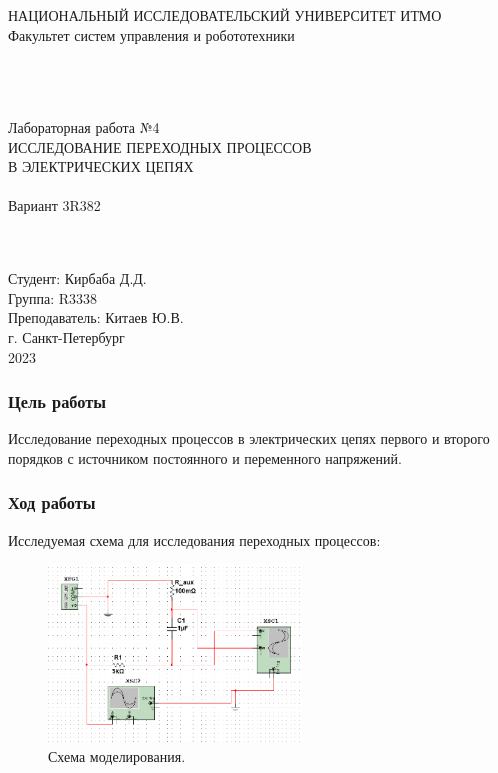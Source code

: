 \documentclass[12pt]{article}
\begin{document}
\begin{titlepage}
\begin{center}
    НАЦИОНАЛЬНЫЙ ИССЛЕДОВАТЕЛЬСКИЙ УНИВЕРСИТЕТ ИТМО \\
    Факультет систем управления и робототехники \\
    \vspace*{10\baselineskip}
    {} \\
    \ \\
    \ \\
    \begin{spacing}{1.5}
    {\large Лабораторная работа №4 \\
    ИССЛЕДОВАНИЕ ПЕРЕХОДНЫХ ПРОЦЕССОВ \\ В ЭЛЕКТРИЧЕСКИХ ЦЕПЯХ \\
    \ \\
    Вариант 3R382}
    \end{spacing} \\
    \ \\
    \vspace*{10\baselineskip}
    \hfill {Студент: Кирбаба Д.Д.\ \ \ \ \ \ \ \ \ } \\
    \hfill {Группа: R3338\ \ \ \ \ \ \ \ \ \ \ \ \ \ \ \ \ \ \ \ \ } \\
    \hfill {Преподаватель: Китаев Ю.В.} \\
    \mbox{}
    \vfill {г. Санкт-Петербург\\2023}
\end{center}
\end{titlepage}

\subsubsection*{Цель работы}
Исследование переходных процессов в электрических цепях первого и второго порядков с источником постоянного и переменного напряжений.

\subsubsection*{Ход работы}
Исследуемая схема для исследования переходных процессов:
\begin{figure}[H]
    \centering
    \includegraphics[width=0.6\textwidth]{scheme.png}
    \caption{Схема моделирования.}
    \label{fig:scheme}
\end{figure}
\end{document}
